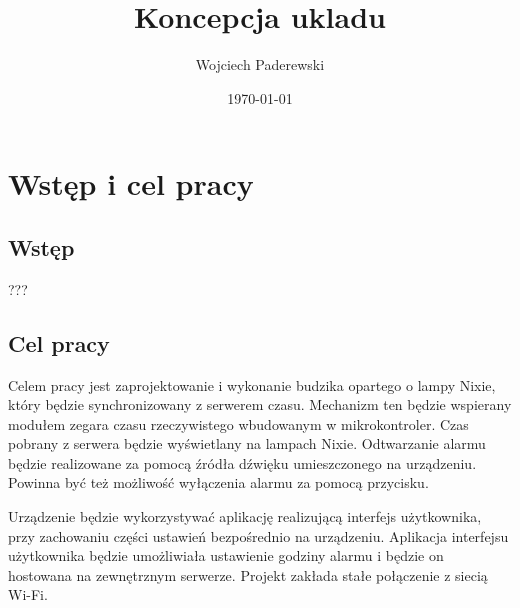 \documentclass[../main.tex]{subfiles}
\author{Wojciech Paderewski}
\date{\today}
\title{Koncepcja ukladu}
\begin{document}
\section{Wstęp i cel pracy}
\subsection{Wstęp}
???
\subsection{Cel pracy}
Celem pracy jest zaprojektowanie i wykonanie budzika opartego o lampy Nixie, który będzie synchronizowany z serwerem czasu. 
Mechanizm ten będzie wspierany modułem zegara czasu rzeczywistego wbudowanym w mikrokontroler. Czas pobrany z serwera będzie wyświetlany na lampach Nixie.
Odtwarzanie alarmu będzie realizowane za pomocą źródła dźwięku umieszczonego na urządzeniu. Powinna być też możliwość wyłączenia alarmu za pomocą przycisku.

Urządzenie będzie wykorzystywać aplikację realizującą interfejs użytkownika, przy zachowaniu części ustawień bezpośrednio
na urządzeniu. Aplikacja interfejsu użytkownika będzie umożliwiała ustawienie godziny alarmu i będzie on hostowana na zewnętrznym serwerze.
Projekt zakłada stałe połączenie z siecią Wi-Fi. 
\end{document}
